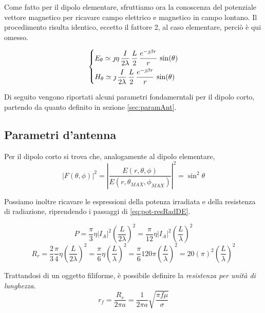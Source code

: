 \bigbreak
Come fatto per il dipolo elementare, sfruttiamo ora la conoscenza del potenziale vettore magnetico per ricavare campo elettrico e magnetico in campo lontano.
Il procedimento risulta identico, eccetto il fattore 2, al caso elementare, perciò è qui omesso.

\begin{equation}\begin{dcases}
	E_\theta
	\simeq \jmath \eta\,\frac{I}{2\lambda}\, \frac{L}{2} \, \frac{e^{-\jmath \beta r}}{r} \, \sin(\theta) \\
	H_\theta
	\simeq \jmath \,\frac{I}{2\lambda}\, \frac{L}{2} \, \frac{e^{-\jmath \beta r}}{r} \, \sin(\theta) \\
\end{dcases}\end{equation}

Di seguito vengono riportati alcuni parametri fondamerntali per il dipolo corto, partendo da quanto definito in sezione \ref{sec:paramAnt}.

\subsection{Parametri d'antenna}

Per il dipolo corto si trova che, analogamente al dipolo elementare,
\begin{equation}
\left | F(\theta, \phi) \right |^2 = \left | \frac{E(r, \theta, \phi)}{E(r, \theta_{MAX}, \phi_{MAX})} \right |^2 = \sin^2\theta
\end{equation}

Possiamo inoltre ricavare le espressioni della potenza irradiata e della resistenza di radiazione, riprendendo i passaggi di \autoref{eq:pot-resRadDE}.

\begin{equation*}
P = \frac{\pi}{3} \eta \left | I_A \right |^2 \left(\frac{L}{2 \lambda}\right)^2 = \frac{\pi}{12} \eta \left | I_A \right |^2 \left(\frac{L}{\lambda}\right)^2
\end{equation*}
\begin{equation*}
R_r = \frac{2}{3} \frac{\pi}{4} \eta \left(\frac{L}{2 \lambda}\right)^2 = \frac{\pi}{6} \eta \left(\frac{L}{\lambda}\right)^2 = \frac{\pi}{6} 120 \pi	 \left(\frac{L}{\lambda}\right)^2 = 20 (\pi)^2 \left(\frac{L}{ \lambda}\right)^2
\end{equation*}

Trattandosi di un oggetto filiforme, è possibile definire la \emph{resistenza per unità di lunghezza}.
\begin{equation*}
			r_f = \frac{R_s}{2 \pi a} = \frac{1}{2 \pi a} \sqrt{\frac{\pi f \mu }{\sigma}}
		\end{equation*}


